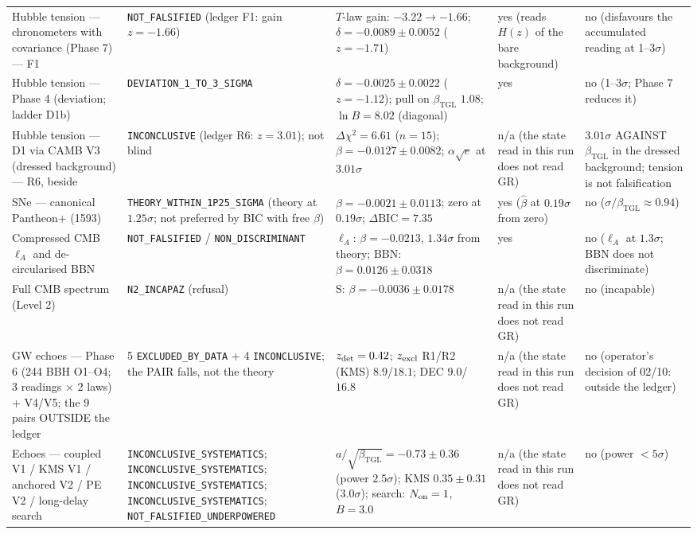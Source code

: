 \documentclass[11pt]{article}
\newcommand{\bTGL}{\beta_{\mathrm{TGL}}}\newcommand{\Msun}{M_{\odot}}\newcommand{\TGL}{\mathrm{TGL}}
\theoremstyle{definition}\newtheorem{deriv}{Derivation}
\begin{document}
\begin{footnotesize}
\begin{longtable}{@{}p{}p{}p{}p{}p{}@{}}
Hubble tension --- chronometers with covariance (Phase 7) --- F1 & \texttt{NOT\_\allowbreak{}FALSIFIED} (ledger F1: gain $z=-1.66$) & $T$-law gain: $-3.22\to-1.66$; $\delta=-0.0089\pm0.0052$ ($z=-1.71$) & yes (reads $H(z)$ of the bare background) & no (disfavours the accumulated reading at 1--3$\sigma$) \\
Hubble tension --- Phase 4 (deviation; ladder D1b) & \texttt{DEVIATION\_\allowbreak{}1\_\allowbreak{}TO\_\allowbreak{}3\_\allowbreak{}SIGMA} & $\delta=-0.0025\pm0.0022$ ($z=-1.12$); pull on $\bTGL$ $1.08$; $\ln B=8.02$ (diagonal) & yes & no (1--3$\sigma$; Phase 7 reduces it) \\
Hubble tension --- D1 via CAMB V3 (dressed background) --- R6, beside & \texttt{INCONCLUSIVE} (ledger R6: $z=3.01$); not blind & $\Delta\chi^2=6.61$ ($n=15$); $\beta=-0.0127\pm0.0082$; $\alpha\sqrt e$ at $3.01\sigma$ & n/a (the state read in this run does not read GR) & $3.01\sigma$ AGAINST $\bTGL$ in the dressed background; tension is not falsification \\
SNe --- canonical Pantheon+ (1593) & \texttt{THEORY\_\allowbreak{}WITHIN\_\allowbreak{}1P25\_\allowbreak{}SIGMA} (theory at $1.25\sigma$; not preferred by BIC with free $\beta$) & $\hat\beta=-0.0021\pm0.0113$; zero at $0.19\sigma$; $\Delta\mathrm{BIC}=7.35$ & yes ($\hat\beta$ at $0.19\sigma$ from zero) & no ($\sigma/\bTGL\approx0.94$) \\
Compressed CMB $\ell_A$ and de-circularised BBN & \texttt{NOT\_\allowbreak{}FALSIFIED} / \texttt{NON\_\allowbreak{}DISCRIMINANT} & $\ell_A$: $\beta=-0.0213$, $1.34\sigma$ from theory; BBN: $\hat\beta=0.0126\pm0.0318$ & yes & no ($\ell_A$ at $1.3\sigma$; BBN does not discriminate) \\
Full CMB spectrum (Level 2) & \texttt{N2\_\allowbreak{}INCAPAZ} (refusal) & S: $\beta=-0.0036\pm0.0178$ & n/a (the state read in this run does not read GR) & no (incapable) \\
GW echoes --- Phase 6 (244 BBH O1--O4; 3 readings $\times$ 2 laws) + V4/V5; the 9 pairs OUTSIDE the ledger & 5 \texttt{EXCLUDED\_BY\_DATA} + 4 \texttt{INCONCLUSIVE}; the PAIR falls, not the theory & $z_{\rm det}=0.42$; $z_{\rm excl}$ R1/R2 (KMS) $8.9$/$18.1$; DEC $9.0$/$16.8$ & n/a (the state read in this run does not read GR) & no (operator's decision of 02/10: outside the ledger) \\
Echoes --- coupled V1 / KMS V1 / anchored V2 / PE V2 / long-delay search & \texttt{INCONCLUSIVE\_\allowbreak{}SYSTEMATICS}; \texttt{INCONCLUSIVE\_\allowbreak{}SYSTEMATICS}; \texttt{INCONCLUSIVE\_\allowbreak{}SYSTEMATICS}; \texttt{INCONCLUSIVE\_\allowbreak{}SYSTEMATICS}; \texttt{NOT\_\allowbreak{}FALSIFIED\_\allowbreak{}UNDERPOWERED} & $a/\sqrt{\bTGL}=-0.73\pm0.36$ (power $2.5\sigma$); KMS $0.35\pm0.31$ ($3.0\sigma$); search: $N_{\rm on}=1$, $B=3.0$ & n/a (the state read in this run does not read GR) & no (power $<5\sigma$) \\

\end{longtable}
\end{footnotesize}
\end{document}
